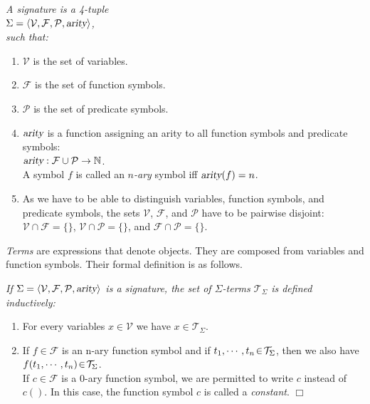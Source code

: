 \begin{Definition}[Signature]
{\em
  A \emph{signature} is a  4-tuple \\[0.2cm]
  \hspace*{1.3cm} 
  $\Sigma = \langle \mathcal{V}, \mathcal{F}, \mathcal{P}, \textsl{arity} \rangle$, 
  \\[0.2cm]
  such that: 
  \begin{enumerate}
  \item $\mathcal{V}$ is the set of variables.
  \item $\mathcal{F}$ is the set of function symbols.
  \item $\mathcal{P}$ is the set of predicate symbols.
  \item $\textsl{arity}$ is a function assigning an arity to all function symbols and predicate
        symbols: 
        \\[0.2cm]
        \hspace*{1.3cm} 
        $\textsl{arity}: \mathcal{F} \cup \mathcal{P} \rightarrow \mathbb{N}$. 
        \\[0.2cm]
        A symbol  $f$ is called an \emph{$n$-ary} symbol iff $\textsl{arity}(f) = n$.
  \item As we have to be able to distinguish variables, function symbols, and predicate symbols,
        the sets $\mathcal{V}$, $\mathcal{F}$, and $\mathcal{P}$ have to be pairwise disjoint: 
        \\[0.2cm] 
        \hspace*{1.3cm} 
        $\mathcal{V} \cap \mathcal{F} = \{\}$, \quad
        $\mathcal{V} \cap \mathcal{P} = \{\}$, \quad and \quad
        $\mathcal{F} \cap \mathcal{P} = \{\}$.
  \end{enumerate}
}
\end{Definition}

\noindent
\emph{Terms} are expressions that denote objects.  They are composed from variables and function
symbols.  Their formal definition is as follows.
\begin{Definition}[Term]
{\em
  If $\Sigma = \langle \mathcal{V}, \mathcal{F}, \mathcal{P}, \textsl{arity} \rangle$ is a
  signature, the set of  $\Sigma$-terms $\mathcal{T}_\Sigma$ is defined inductively:
  \begin{enumerate}
  \item For every variables $x \in \mathcal{V}$ we have $x \in \mathcal{T}_\Sigma$.
  \item If $f \in \mathcal{F}$ is an n-ary function symbol and if  
        $t_1,\cdots,t_n \!\in\! \mathcal{T}_\Sigma$, then we also have 
        \\[0.2cm]
        \hspace*{1.3cm} 
        $f(t_1,\cdots,t_n) \!\in\! \mathcal{T}_\Sigma$. 
        \\[0.2cm]
        If $c \in \mathcal{F}$ is a 0-ary function symbol, we are permitted to write 
        $c$ instead of $c()$.  In this case, the function symbol $c$ is called a 
        \emph{constant}.
        \hspace*{\fill} $\Box$
  \end{enumerate}
}
\end{Definition}

